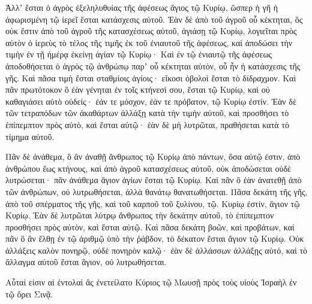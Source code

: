 {Ἀλλʼ ἔσται ὁ ἀγρὸς ἐξεληλυθυίας τῆς ἀφέσεως ἅγιος τῷ Κυρίῳ, ὥσπερ ἡ γῆ ἡ ἀφωρισμένη τῷ ἱερεῖ ἔσται κατάσχεσις αὐτοῦ.
Ἐὰν δὲ ἀπὸ τοῦ ἀγροῦ οὗ κέκτηται, ὃς οὐκ ἔστιν ἀπὸ τοῦ ἀγροῦ τῆς κατασχέσεως αὐτοῦ, ἁγιάσῃ τῷ Κυρίῳ,
λογιεῖται πρὸς αὐτὸν ὁ ἱερεὺς τὸ τέλος τῆς τιμῆς ἐκ τοῦ ἐνιαυτοῦ τῆς ἀφέσεως, καὶ ἀποδώσει τὴν τιμὴν ἐν τῇ ἡμέρᾳ ἐκείνῃ ἁγίαν τῷ Κυρίῳ·
Καὶ ἐν τῷ ἐνιαυτῷ τῆς ἀφέσεως ἀποδοθήσεται ὁ ἀγρὸς τῷ ἀνθρώπῳ παρʼ οὗ κέκτηται αὐτὸν, οὗ ἦν ἡ κατάσχεσις τῆς γῆς.
Καὶ πᾶσα τιμὴ ἔσται σταθμίοις ἁγίοις· εἴκοσι ὀβολοὶ ἔσται τὸ δίδραχμον.
Καὶ πᾶν πρωτότοκον ὃ ἐὰν γένηται ἐν τοῖς κτήνεσί σου, ἔσται τῷ Κυρίῳ, καὶ οὐ καθαγιάσει αὐτὸ οὐδείς· ἐάν τε μόσχον, ἐάν τε πρόβατον, τῷ Κυρίῳ ἐστίν.
Ἐὰν δὲ τῶν τετραπόδων τῶν ἀκαθάρτων ἀλλάξῃ κατὰ τὴν τιμὴν αὐτοῦ, καὶ προσθήσει τὸ ἐπίπεμπτον πρὸς αὐτὸ, καὶ ἔσται αὐτῷ· ἐὰν δὲ μὴ λυτρῶται, πραθήσεται κατὰ τὸ τίμημα αὐτοῦ.
\par }{\PP {}Πᾶν δὲ ἀνάθεμα, ὃ ἂν ἀναθῇ ἄνθρωπος τῷ Κυρίῳ ἀπὸ πάντων, ὅσα αὐτῷ ἐστιν, ἀπὸ ἀνθρώπου ἕως κτήνους, καὶ ἀπὸ ἀγροῦ κατασχέσεως αὐτοῦ, οὐκ ἀποδώσεται οὐδὲ λυτρώσεται· πᾶν ἀνάθεμα ἅγιον ἁγίων ἔσται τῷ Κυρίῳ.
Καὶ πᾶν ὃ ἐὰν ἀνατεθῇ ἀπὸ τῶν ἀνθρώπων, οὐ λυτρωθήσεται, ἀλλὰ θανάτῳ θανατωθήσεται.
Πᾶσα δεκάτη τῆς γῆς, ἀπὸ τοῦ σπέρματος τῆς γῆς, καὶ τοῦ καρποῦ τοῦ ξυλίνου, τῷ. Κυρίῳ ἐστίν, ἅγιον τῷ Κυρίῳ.
Ἐὰν δὲ λυτρῶται λύτρῳ ἄνθρωπος τὴν δεκάτην αὐτοῦ, τὸ ἐπίπεμπτον προσθήσει πρὸς αὐτὸν, καὶ ἔσται αὐτῷ.
Καὶ πᾶσα δεκάτη βοῶν, καὶ προβάτων, καὶ πᾶν ὃ ἂν ἔλθῃ ἐν τῷ ἀριθμῷ ὑπὸ τὴν ῥάβδον, τὸ δέκατον ἔσται ἅγιον τῷ Κυρίῳ.
Οὐκ ἀλλάξεις καλὸν πονηρῷ, οὐδὲ πονηρὸν καλῷ· ἐὰν δὲ ἀλλάσσων ἀλλάξῃς αὐτό, καὶ τὸ ἄλλαγμα αὐτοῦ ἔσται ἅγιον, οὐ λυτρωθήσεται.
\par }{\PP {}Αὗταί εἰσιν αἱ ἐντολαὶ ἃς ἐνετείλατο Κύριος τῷ Μωυσῇ πρὸς τοὺς υἱοὺς Ἰσραὴλ ἐν τῷ ὄρει Σινᾷ.
\par }